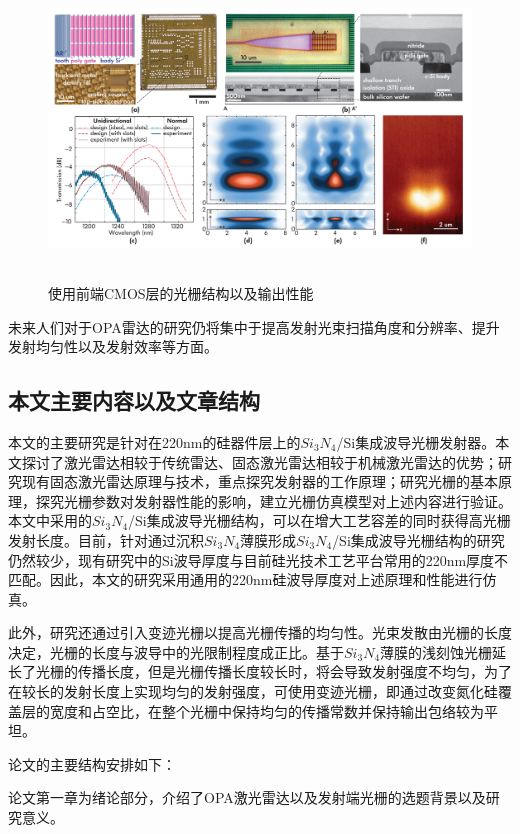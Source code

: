 \documentclass[UTF8,a4paper,12pt]{ctexart}
\numberwithin{equation}{section}
\begin{document}
\begin{figure}[htbp]
\centering %
\includegraphics[height=8cm,width=15cm]{fig13.png}
\caption{使用前端CMOS层的光栅结构以及输出性能}
\label{1-5}
\end{figure}



未来人们对于OPA雷达的研究仍将集中于提高发射光束扫描角度和分辨率、提升发射均匀性以及发射效率等方面。


\subsection{本文主要内容以及文章结构}

本文的主要研究是针对在220nm的硅器件层上的$Si_3N_4$/Si集成波导光栅发射器。本文探讨了激光雷达相较于传统雷达、固态激光雷达相较于机械激光雷达的优势；研究现有固态激光雷达原理与技术，重点探究发射器的工作原理；研究光栅的基本原理，探究光栅参数对发射器性能的影响，建立光栅仿真模型对上述内容进行验证。本文中采用的$Si_3N_4$/Si集成波导光栅结构，可以在增大工艺容差的同时获得高光栅发射长度。目前，针对通过沉积$Si_3N_4$薄膜形成$Si_3N_4$/Si集成波导光栅结构的研究仍然较少，现有研究中的Si波导厚度与目前硅光技术工艺平台常用的220nm厚度不匹配。因此，本文的研究采用通用的220nm硅波导厚度对上述原理和性能进行仿真。

此外，研究还通过引入变迹光栅以提高光栅传播的均匀性。光束发散由光栅的长度决定，光栅的长度与波导中的光限制程度成正比。基于$Si_3N_4$薄膜的浅刻蚀光栅延长了光栅的传播长度，但是光栅传播长度较长时，将会导致发射强度不均匀，为了在较长的发射长度上实现均匀的发射强度，可使用变迹光栅，即通过改变氮化硅覆盖层的宽度和占空比，在整个光栅中保持均匀的传播常数并保持输出包络较为平坦。

论文的主要结构安排如下：

论文第一章为绪论部分，介绍了OPA激光雷达以及发射端光栅的选题背景以及研究意义。
\end{document}
